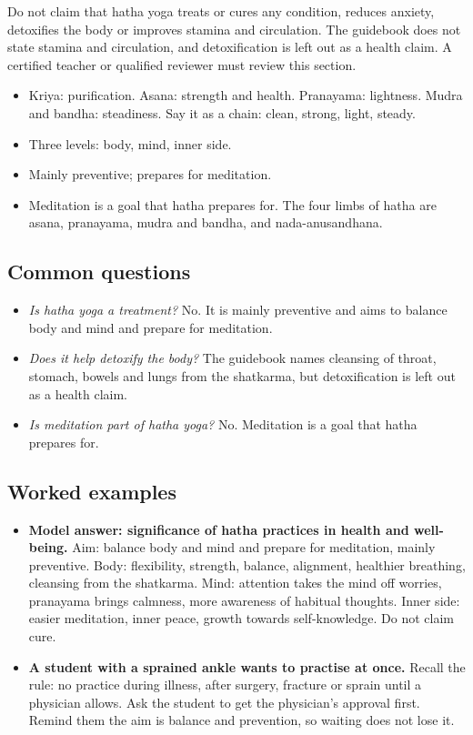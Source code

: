 \begin{caution}
Do not claim that hatha yoga treats or cures any condition, reduces anxiety, detoxifies the body or improves stamina and circulation. The guidebook does not state stamina and circulation, and detoxification is left out as a health claim. A certified teacher or qualified reviewer must review this section.
\end{caution}

\begin{recall}
\begin{itemize}
\item Kriya: purification. Asana: strength and health. Pranayama: lightness. Mudra and bandha: steadiness. Say it as a chain: clean, strong, light, steady.
\item Three levels: body, mind, inner side.
\item Mainly preventive; prepares for meditation.
\item Meditation is a goal that hatha prepares for. The four limbs of hatha are asana, pranayama, mudra and bandha, and nada-anusandhana.
\end{itemize}
\end{recall}

\subsection*{Common questions}
\begin{itemize}
\item \emph{Is hatha yoga a treatment?} No. It is mainly preventive and aims to balance body and mind and prepare for meditation.
\item \emph{Does it help detoxify the body?} The guidebook names cleansing of throat, stomach, bowels and lungs from the shatkarma, but detoxification is left out as a health claim.
\item \emph{Is meditation part of hatha yoga?} No. Meditation is a goal that hatha prepares for.
\end{itemize}

\subsection*{Worked examples}
\begin{itemize}
\item \textbf{Model answer: significance of hatha practices in health and well-being.} Aim: balance body and mind and prepare for meditation, mainly preventive. Body: flexibility, strength, balance, alignment, healthier breathing, cleansing from the shatkarma. Mind: attention takes the mind off worries, pranayama brings calmness, more awareness of habitual thoughts. Inner side: easier meditation, inner peace, growth towards self-knowledge. Do not claim cure.
\item \textbf{A student with a sprained ankle wants to practise at once.} Recall the rule: no practice during illness, after surgery, fracture or sprain until a physician allows. Ask the student to get the physician's approval first. Remind them the aim is balance and prevention, so waiting does not lose it.
\end{itemize}

